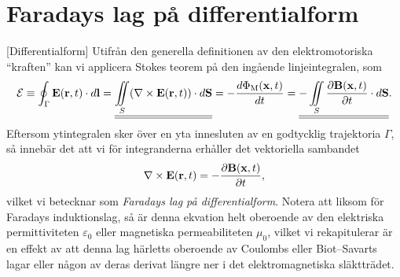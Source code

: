 \section{Faradays lag p{\aa} differentialform}
[Differentialform]
Utifr{\aa}n den generella definitionen av den elektromotoriska ``kraften''
kan vi applicera Stokes teorem p{\aa} den ing{\aa}ende linjeintegralen, som
$$
  {\cal E}
    \equiv\oint_{\Gamma}{\bf E}({\bf r},t)\cdot d{\bf l}
    =\underline{\underline{
        \iint_{S}(\nabla\times{\bf E}({\bf r},t))\cdot d{\bf S}
     }}
    =-{{d\Phi_{\rm M}({\bf x},t)}\over{dt}}
    =\underline{\underline{
        -\iint_S{{\partial{\bf B}({\bf x},t)}\over{\partial t}}\cdot d{\bf S}
     }}.
$$
Eftersom ytintegralen sker {\"o}ver en yta innesluten av en godtycklig
trajektoria $\Gamma$, s{\aa} inneb{\"a}r det att vi f{\"o}r integranderna
erh{\aa}ller det vektoriella sambandet
$$
  \nabla\times{\bf E}({\bf r},t)
    =-{{\partial{\bf B}({\bf x},t)}\over{\partial t}},
$$
vilket vi betecknar som {\it Faradays lag p{\aa} differentialform}.
Notera att liksom f{\"o}r Faradays induktionslag, s{\aa} {\"a}r denna ekvation
helt oberoende av den elektriska permittiviteten $\varepsilon_0$ eller
magnetiska permeabiliteten $\mu_0$, vilket vi rekapitulerar {\"a}r en effekt
av att denna lag h{\"a}rletts oberoende av Coulombs eller Biot--Savarts lagar
eller n{\aa}gon av deras derivat l{\"a}ngre ner i det elektromagnetiska
sl{\"a}kttr{\"a}det.
\vfill\eject


